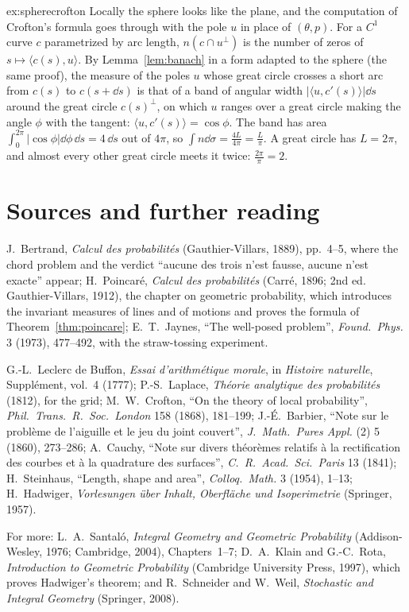 \begin{solution}{ex:spherecrofton}
\idea Locally the sphere looks like the plane, and the computation of Crofton's formula goes through with the pole $u$ in place of $(\theta,p)$.
\writeup For a $C^1$ curve $c$ parametrized by arc length, $n(c\cap u^\perp)$ is the number of zeros of $s\mapsto\langle c(s),u\rangle$. By Lemma~\ref{lem:banach} in a form adapted to the sphere (the same proof), the measure of the poles $u$
whose great circle crosses a short arc from $c(s)$ to $c(s+\dd s)$ is that of a band of angular width $|\langle u,c'(s)\rangle|\dd s$ around the great circle $c(s)^\perp$, on which $u$ ranges over a great circle making the angle
$\phi$ with the tangent: $\langle u,c'(s)\rangle=\cos\phi$. The band has area $\int_0^{2\pi}|\cos\phi|\dd\phi\,\dd s=4\,\dd s$ out of $4\pi$, so $\int n\dd\sigma=\frac{4L}{4\pi}=\frac L\pi$. A great circle has $L=2\pi$, and almost every other great circle meets it
twice: $\frac{2\pi}\pi=2$.
\end{solution}

\section*{Sources and further reading}

J.~Bertrand, \emph{Calcul des probabilités} (Gauthier-Villars, 1889), pp.~4--5, where the chord problem and the verdict ``aucune des trois n'est fausse, aucune n'est exacte'' appear;
H.~Poincaré, \emph{Calcul des probabilités} (Carré, 1896; 2nd ed. Gauthier-Villars, 1912), the chapter on geometric probability, which introduces the invariant measures of lines and of motions and proves the formula of
Theorem~\ref{thm:poincare}; E.~T.~Jaynes, ``The well-posed problem'', \emph{Found.\ Phys.} 3 (1973), 477--492, with the straw-tossing experiment.

G.-L.~Leclerc de Buffon, \emph{Essai d'arithmétique morale}, in \emph{Histoire naturelle}, Supplément, vol.~4 (1777); P.-S.~Laplace, \emph{Théorie analytique des probabilités} (1812), for the grid; M.~W.~Crofton,
``On the theory of local probability'', \emph{Phil.\ Trans.\ R.\ Soc.\ London} 158 (1868), 181--199; J.-É.~Barbier, ``Note sur le problème de l'aiguille et le jeu du joint couvert'', \emph{J.\ Math.\ Pures Appl.} (2) 5 (1860),
273--286; A.~Cauchy, ``Note sur divers théorèmes relatifs à la rectification des courbes et à la quadrature des surfaces'', \emph{C.\ R.\ Acad.\ Sci.\ Paris} 13 (1841); H.~Steinhaus, ``Length,
shape and area'', \emph{Colloq.\ Math.} 3 (1954), 1--13; H.~Hadwiger, \emph{Vorlesungen über Inhalt, Oberfläche und Isoperimetrie} (Springer, 1957).

For more: L.~A.~Santaló, \emph{Integral Geometry and Geometric Probability} (Addison-Wesley, 1976; Cambridge, 2004), Chapters~1--7; D.~A.~Klain and G.-C.~Rota, \emph{Introduction to Geometric
Probability} (Cambridge University Press, 1997), which proves Hadwiger's theorem; and R.~Schneider and W.~Weil, \emph{Stochastic and Integral Geometry} (Springer, 2008).
